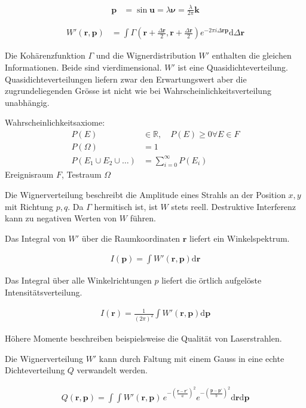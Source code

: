 \documentclass{article}
\newcommand{\vect}[1]{\mathbf{#1}}
\renewcommand{\r}{\vect r}
\newcommand{\p}{\vect p}
\renewcommand{\k}{\vect k}
\newcommand{\vnu}{\boldsymbol\nu}
\begin{document}
\begin{align}
  \p &= \sin\vect u = \lambda \vnu = \frac{\lambda}{2\pi} \k
\end{align}

\begin{align}
  W'(\r,\p) &= \int\Gamma\left(\r+\frac{\Delta\r}{2},\r+\frac{\Delta\r}{2}\right) e^{-2\pi i \Delta\r\p}\textrm{d}\Delta\r
\end{align}


Die Koh\"arenzfunktion $\Gamma$ und die Wignerdistribution $W'$
enthalten die gleichen Informationen. Beide sind vierdimensional. $W'$
ist eine Quasidichteverteilung. Quasidichteverteilungen liefern zwar
den Erwartungswert aber die zugrundeliegenden Gr\"osse ist nicht wie
bei Wahrscheinlichkeitsverteilung unabh\"angig.

Wahrscheinlichkeitsaxiome:
\begin{align}
  P(E)&\in\mathbb{R},\quad P(E)\ge 0 \forall E \in F\\
  P(\Omega) &= 1\\
  P(E_1\cup E_2\cup\ldots) &= \sum_{i=0}^\infty P(E_i)
\end{align}
Ereignisraum $F$, Testraum $\Omega$


Die Wignerverteilung beschreibt die Amplitude eines Strahls an der
Position $x, y$ mit Richtung $p, q$. Da $\Gamma$ hermitisch ist, ist
$W$ stets reell. Destruktive Interferenz kann zu negativen Werten von
$W$ f\"uhren.

Das Integral von $W'$ \"uber die Raumkoordinaten $\r$ liefert ein
Winkelspektrum.

\begin{align}
  I(\p) = \int W'(\r,\p) \textrm{d}\r
\end{align}

Das Integral \"uber alle Winkelrichtungen $p$ liefert
die \"ortlich aufgel\"oste Intensit\"atsverteilung.

\begin{align}
  I(\r) = \frac{1}{(2\pi)^2} \int W'(\r,\p) \textrm{d}\p
\end{align}

H\"ohere Momente beschreiben beispielsweise die Qualit\"at von
Laserstrahlen.

Die Wignerverteilung $W'$ kann durch Faltung mit einem Gauss in eine
echte Dichteverteilung $Q$ verwandelt werden.

\begin{align}
  Q(\r,\p) = \int\int W'(\r,\p)\, e^{-\left(\frac{\r-\r'}{a}\right)^2} e^{-\left(\frac{\p-\p'}{b}\right)^2}\textrm{d}\r\textrm{d}\p
\end{align}
\end{document}
